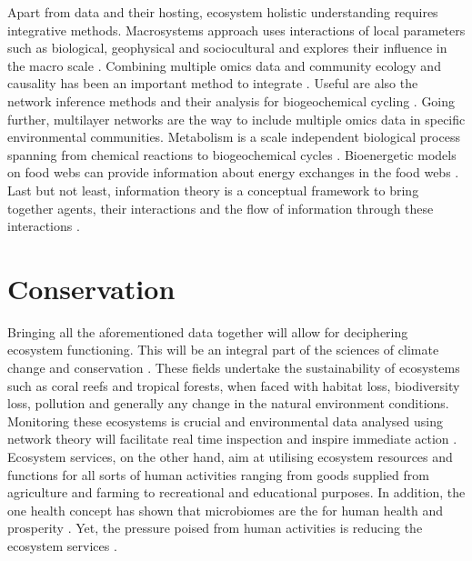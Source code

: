 Apart from data and their hosting, ecosystem holistic understanding requires
integrative methods. Macrosystems approach uses interactions of local parameters
such as biological, geophysical and sociocultural and explores their influence in
the macro scale \parencite{heffernan2014}. Combining multiple omics data and community ecology and causality has
been an important method to integrate \parencite{jurburg2022community}. Useful are also the network inference methods 
and their analysis for biogeochemical cycling \parencite{jameson2023Network}. Going further, multilayer networks \parencite{marine-multilayers}
are the way to include multiple omics data in specific environmental communities. 
Metabolism is a scale independent biological process spanning from chemical reactions
to biogeochemical cycles \parencite{hall2018understanding}. Bioenergetic models on food 
webs can provide information about energy exchanges in the food webs \parencite{valdovinos2023bioenergetic}.
Last but not least, information theory is a conceptual framework to bring together agents,
their interactions and the flow of information through these interactions \parencite{oconnor-information-ecology}.

\section{Conservation}
\label{sec:conservation}

Bringing all the aforementioned data together will allow for deciphering ecosystem functioning.
This will be an integral part of the sciences of climate change
and conservation \parencite{cavicchioli2019scientists}. These fields undertake the
sustainability of ecosystems such as coral reefs and tropical forests, when
faced with habitat loss, biodiversity loss, pollution and generally any change
in the natural environment conditions. Monitoring these ecosystems is crucial
and environmental data analysed using network theory will facilitate real time
inspection and inspire immediate action \parencite{derocles2018Biomonitoring}.
Ecosystem services, on the other hand, aim at utilising ecosystem resources
and functions for all sorts of human activities ranging from goods supplied
from agriculture and farming \parencite{alvarez-silva2017Compartmentalized} to
recreational and educational purposes. In addition, the one health concept has
shown that microbiomes are the for human health and prosperity
\parencite{banerjee2023Soil, lehmann2020concept}. Yet, the pressure poised from human activities
is reducing the ecosystem services \parencite{rillig2023Increasing}.

